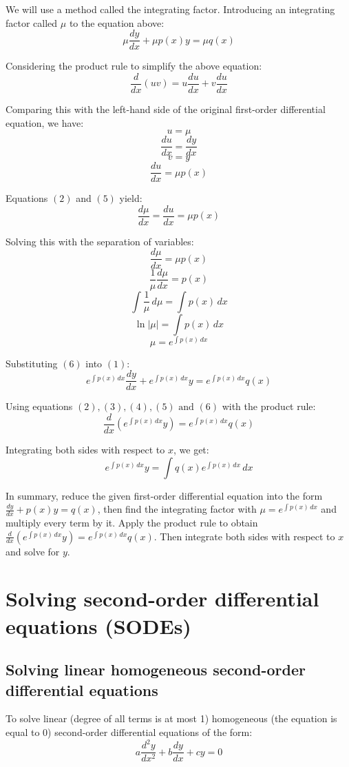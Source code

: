 \documentclass[11pt]{article}
\begin{document}
We will use a method called the integrating factor. Introducing an integrating factor called \(\mu\) to the equation above:
\[\mu \frac{dy}{dx} + \mu p(x)y = \mu q(x)\]

Considering the product rule to simplify the above equation:
\[\frac{d}{dx} (uv) = u \frac{du}{dx} + v \frac{du}{dx}\]

Comparing this with the left-hand side of the original first-order differential equation, we have:
\[u = \mu \tag{2}\]
\[\frac{du}{dx} = \frac{dy}{dx} \tag{3}\]
\[v = y \tag{4}\]
\[\frac{du}{dx} = \mu p(x) \tag{5}\]

Equations \((2)\) and \((5)\) yield:
\[\frac{d \mu}{dx} = \frac{du}{dx} = \mu p (x)\]

Solving this with the separation of variables:
\[\frac{d \mu}{dx} = \mu p(x)\]
\[\frac{1}{\mu} \frac{d \mu}{dx} = p(x)\]
\[\int \frac{1}{\mu} \, d \mu = \int p(x) \, dx\]
\[\ln |\mu| = \int p(x) \, dx\]
\[\mu = e^{\int p(x) \, dx} \tag{6}\]

Substituting \((6)\) into \((1)\):
\[e^{\int p(x) \, dx} \frac{dy}{dx} + e^{\int p(x) \, dx} y = e^{\int p(x) \, dx} q(x)\]

Using equations \((2), (3), (4), (5) \text{ and } (6)\) with the product rule:
\[\frac{d}{dx} \left( e^{\int p(x) \, dx} y \right) = e^{\int p(x) \, dx} q(x)\]

Integrating both sides with respect to \(x\), we get:
\[e^{\int p(x) \, dx} y = \int q(x) e^{\int p(x) \, dx} \, dx\]

In summary, reduce the given first-order differential equation into the form \(\frac{dy}{dx} + p(x) y = q(x)\), then find the integrating factor with \(\mu = e^{\int p(x) \, dx}\) and multiply every term by it. Apply the product rule to obtain \(\frac{d}{dx} \left( e^{\int p(x) \, dx} y \right) = e^{\int p(x) \, dx} q(x)\). Then integrate both sides with respect to \(x\) and solve for \(y\).
\section{Solving second-order differential equations (SODEs)}
\label{sec:org4767fdb}

\subsection{Solving linear homogeneous second-order differential equations}
\label{sec:org473847a}
To solve linear (degree of all terms is at most 1) homogeneous (the equation is equal to 0) second-order differential equations of the form:
\[a \frac{d^2y}{dx^2} + b \frac{dy}{dx} + cy = 0\]
\end{document}
